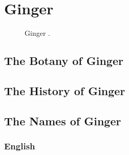 \section{Ginger}
\label{sec:ginger}



\begin{figure}[!ht]
	\vspace{-4ex}
	\centering
	\hfill
	\caption{Ginger \taxon{}.}
	\label{fig:ginger_imgs}
\end{figure}

\subsection{The Botany of Ginger}

\subsection{The History of Ginger}

\subsection{The Names of Ginger}

\subsubsection{English}


